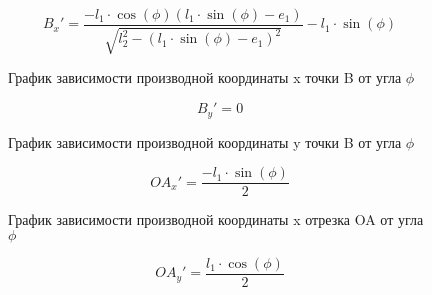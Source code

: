 \begin{equation}\label{eq:yAdphi}
	B_x'=\dfrac{-l_1\cdot\cos(\phi)(l_1\cdot\sin(\phi)-e_1)}{\sqrt{l_2^2-(l_1\cdot \sin(\phi)-e_1)^2}} - l_1\cdot\sin(\phi)
\end{equation}

\begin{figure}[H]
	\centering
	\caption{График зависимости производной координаты x точки B от угла $\phi$}
\end{figure}
\newpage

\begin{equation}\label{eq:yAdphi}
	B_y'=0
\end{equation}

\begin{figure}[H]
	\centering
	\caption{График зависимости производной координаты y точки B от угла $\phi$}
\end{figure}
\newpage

\begin{equation}\label{eq:xOAdphi}
	OA_x'=\dfrac{-l_1\cdot\sin(\phi)}{2}
\end{equation}

\begin{figure}[H]
	\centering
	\caption{График зависимости производной координаты x отрезка OA от угла $\phi$}
\end{figure}
\newpage

\begin{equation}\label{eq:yOAdphi}
	OA_y'=\dfrac{l_1\cdot\cos(\phi)}{2}
\end{equation}

